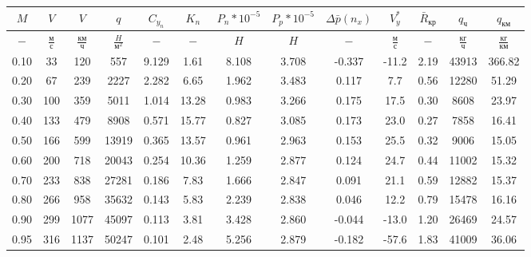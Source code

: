 \begin{tabular}{|c|c|c|c|c|c|c|c|c|c|c|c|c|}
\hline
$M$ & $V$ & $V$ & $q$ & $C_{y_n}$ & $K_n$ & $P_n*10^{-5}$ & $P_p*10^{-5}$ & $\Delta \bar{p}(n_x)$ & $V_y^*$ & $\bar{R}_{кр}$ & $q_{ч}$ & $q_{км}$ \\ 
\hline
$-$ & $\frac{м}{с}$ & $\frac{км}{ч}$ & $\frac{H}{м^2}$ & $-$ & $-$ & $H$ & $H$ & $-$ & $\frac{м}{с}$ & $-$ & $\frac{кг}{ч}$ & $\frac{кг}{км}$ \\ 
\hline
0.10 & 33 & 120 & 557 & 9.129 & 1.61 & 8.108 & 3.708 & -0.337 & -11.2 & 2.19 & 43913 & 366.82 \\ 
\hline
0.20 & 67 & 239 & 2227 & 2.282 & 6.65 & 1.962 & 3.483 & 0.117 & 7.7 & 0.56 & 12280 & 51.29 \\ 
\hline
0.30 & 100 & 359 & 5011 & 1.014 & 13.28 & 0.983 & 3.266 & 0.175 & 17.5 & 0.30 & 8608 & 23.97 \\ 
\hline
0.40 & 133 & 479 & 8908 & 0.571 & 15.77 & 0.827 & 3.085 & 0.173 & 23.0 & 0.27 & 7858 & 16.41 \\ 
\hline
0.50 & 166 & 599 & 13919 & 0.365 & 13.57 & 0.961 & 2.963 & 0.153 & 25.5 & 0.32 & 9006 & 15.05 \\ 
\hline
0.60 & 200 & 718 & 20043 & 0.254 & 10.36 & 1.259 & 2.877 & 0.124 & 24.7 & 0.44 & 11002 & 15.32 \\ 
\hline
0.70 & 233 & 838 & 27281 & 0.186 & 7.83 & 1.666 & 2.847 & 0.091 & 21.1 & 0.59 & 12882 & 15.37 \\ 
\hline
0.80 & 266 & 958 & 35632 & 0.143 & 5.83 & 2.239 & 2.838 & 0.046 & 12.2 & 0.79 & 15478 & 16.16 \\ 
\hline
0.90 & 299 & 1077 & 45097 & 0.113 & 3.81 & 3.428 & 2.860 & -0.044 & -13.0 & 1.20 & 26469 & 24.57 \\ 
\hline
0.95 & 316 & 1137 & 50247 & 0.101 & 2.48 & 5.256 & 2.879 & -0.182 & -57.6 & 1.83 & 41009 & 36.06 \\ 
\hline
\end{tabular}